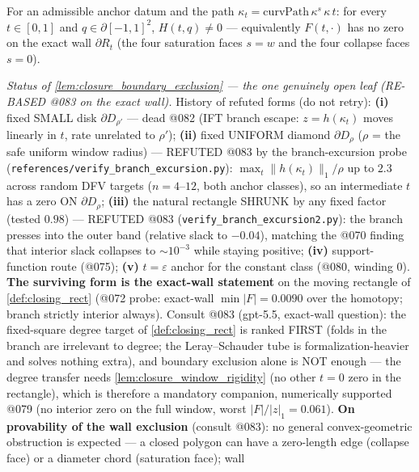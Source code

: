 \begin{lemma}
  \label{lem:closure_boundary_exclusion}
  For an admissible anchor datum and the path $\kappa_t =
  \mathrm{curvPath}\,\kappa^s\,\kappa\,t$: for every $t \in [0,1]$ and
  $q \in \partial[-1,1]^2$, $H(t,q) \ne 0$ --- equivalently $F(t,\cdot)$ has
  no zero on the exact wall $\partial R_t$ (the four saturation faces
  $s = w$ and the four collapse faces $s = 0$).
\end{lemma}

\emph{Status of \cref{lem:closure_boundary_exclusion} --- the one genuinely open
leaf (RE-BASED @083 on the exact wall).} History of refuted forms (do not
retry): \textbf{(i)} fixed SMALL disk $\partial D_{\rho'}$ --- dead @082 (IFT
branch escape: $z = h(\kappa_t)$ moves linearly in $t$, rate unrelated to
$\rho'$); \textbf{(ii)} fixed UNIFORM diamond $\partial D_\rho$ ($\rho$ = the
safe uniform window radius) --- REFUTED @083 by the branch-excursion probe
(\texttt{references/verify\_branch\_excursion.py}): $\max_t \|h(\kappa_t)\|_1
/ \rho$ up to $2.3$ across random DFV targets ($n = 4$--$12$, both anchor
classes), so an intermediate $t$ has a zero ON $\partial D_\rho$;
\textbf{(iii)} the natural rectangle SHRUNK by any fixed factor (tested
$0.98$) --- REFUTED @083 (\texttt{verify\_branch\_excursion2.py}): the branch
presses into the outer band (relative slack to $-0.04$), matching the @070
finding that interior slack collapses to $\sim10^{-3}$ while staying positive;
\textbf{(iv)} support-function route (@075); \textbf{(v)} $t=\varepsilon$
anchor for the constant class (@080, winding $0$). \textbf{The surviving form
is the exact-wall statement} on the moving rectangle of \cref{def:closing_rect}
(@072 probe: exact-wall $\min|F| = 0.0090$ over the homotopy; branch strictly
interior always). Consult @083 (gpt-5.5, exact-wall question): the fixed-square
degree target of \cref{def:closing_rect} is ranked FIRST (folds in the branch
are irrelevant to degree; the Leray--Schauder tube is formalization-heavier and
solves nothing extra), and boundary exclusion alone is NOT enough --- the
degree transfer needs \cref{lem:closure_window_rigidity} (no other $t=0$ zero
in the rectangle), which is therefore a mandatory companion, numerically
supported @079 (no interior zero on the full window, worst $|F|/|z|_1 =
0.061$). \textbf{On provability of the wall exclusion} (consult @083): no
general convex-geometric obstruction is expected --- a closed polygon can have
a zero-length edge (collapse face) or a diameter chord (saturation face); wall
